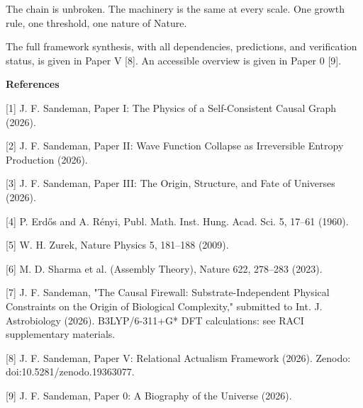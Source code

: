 \documentclass[12pt,a4paper]{article}
\begin{document}
The chain is unbroken. The machinery is the same at every scale. One
growth rule, one threshold, one nature of Nature.

The full framework synthesis, with all dependencies, predictions, and
verification status, is given in Paper V {[}8{]}. An accessible overview
is given in Paper 0 {[}9{]}.

\textbf{References}

{[}1{]} J. F. Sandeman, Paper I: The Physics of a Self-Consistent Causal
Graph (2026).

{[}2{]} J. F. Sandeman, Paper II: Wave Function Collapse as Irreversible
Entropy Production (2026).

{[}3{]} J. F. Sandeman, Paper III: The Origin, Structure, and Fate of
Universes (2026).

{[}4{]} P. Erdős and A. Rényi, Publ. Math. Inst. Hung. Acad. Sci. 5,
17--61 (1960).

{[}5{]} W. H. Zurek, Nature Physics 5, 181--188 (2009).

{[}6{]} M. D. Sharma et al. (Assembly Theory), Nature 622, 278--283
(2023).

{[}7{]} J. F. Sandeman, "The Causal Firewall: Substrate-Independent
Physical Constraints on the Origin of Biological Complexity," submitted
to Int. J. Astrobiology (2026). B3LYP/6-311+G* DFT calculations: see
RACI supplementary materials.

{[}8{]} J. F. Sandeman, Paper V: Relational Actualism Framework (2026).
Zenodo: doi:10.5281/zenodo.19363077.

{[}9{]} J. F. Sandeman, Paper 0: A Biography of the Universe (2026).
\end{document}
